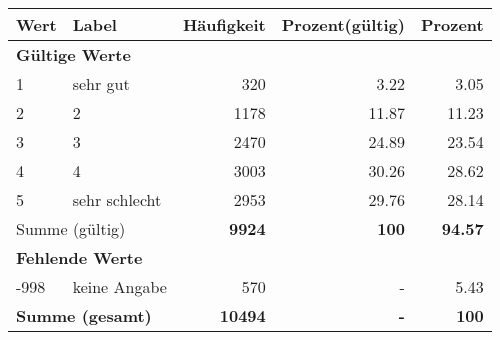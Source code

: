      \begin{longtable}{lXrrr}
     \toprule
     \textbf{Wert} & \textbf{Label} & \textbf{Häufigkeit} & \textbf{Prozent(gültig)} & \textbf{Prozent} \\
     \endhead
     \midrule
     \multicolumn{5}{l}{\textbf{Gültige Werte}}\\

     1 &
     \multicolumn{1}{X}{ sehr gut   } &


       \num{320} &
       \num[round-mode=places,round-precision=2]{3,22} &
         \num[round-mode=places,round-precision=2]{3,05} \\

     2 &
     \multicolumn{1}{X}{ 2   } &


       \num{1178} &
       \num[round-mode=places,round-precision=2]{11,87} &
         \num[round-mode=places,round-precision=2]{11,23} \\

     3 &
     \multicolumn{1}{X}{ 3   } &


       \num{2470} &
       \num[round-mode=places,round-precision=2]{24,89} &
         \num[round-mode=places,round-precision=2]{23,54} \\

     4 &
     \multicolumn{1}{X}{ 4   } &


       \num{3003} &
       \num[round-mode=places,round-precision=2]{30,26} &
         \num[round-mode=places,round-precision=2]{28,62} \\

     5 &
     \multicolumn{1}{X}{ sehr schlecht   } &


       \num{2953} &
       \num[round-mode=places,round-precision=2]{29,76} &
         \num[round-mode=places,round-precision=2]{28,14} \\
     \midrule
     \multicolumn{2}{l}{Summe (gültig)} &
       \textbf{\num{9924}} &
     \textbf{100} &
       \textbf{\num[round-mode=places,round-precision=2]{94,57}} \\
     \multicolumn{5}{l}{\textbf{Fehlende Werte}}\\
       -998 &
       keine Angabe &
         \num{570} &
        - &
         \num[round-mode=places,round-precision=2]{5,43} \\
     \midrule
     \multicolumn{2}{l}{\textbf{Summe (gesamt)}} &
          \textbf{\num{10494}} &
        \textbf{-} &
        \textbf{100} \\
     \bottomrule
     \end{longtable}
     
